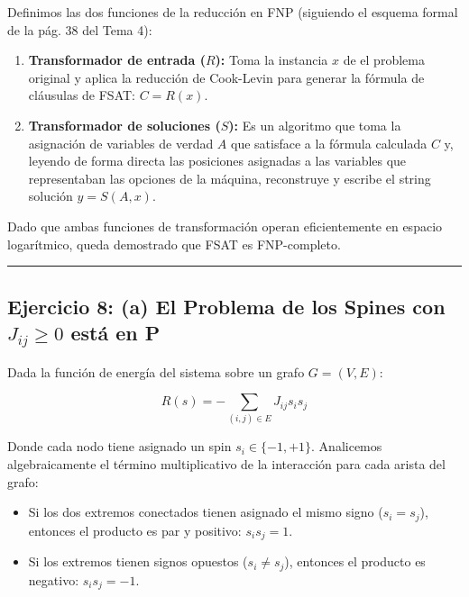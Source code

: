 \documentclass[12pt]{book} %
\providecommand{\tightlist}{%
  \setlength{\itemsep}{0pt}\setlength{\parskip}{0pt}}
\begin{document}
Definimos las dos funciones de la reducción en FNP (siguiendo el esquema
formal de la pág. 38 del Tema 4):

\begin{enumerate}
\def\labelenumi{\arabic{enumi}.}
\item
  \textbf{Transformador de entrada (\(R\)):} Toma la instancia \(x\) de
  el problema original y aplica la reducción de Cook-Levin para generar
  la fórmula de cláusulas de FSAT: \(C = R(x)\).
\item
  \textbf{Transformador de soluciones (\(S\)):} Es un algoritmo que toma
  la asignación de variables de verdad \(A\) que satisface a la fórmula
  calculada \(C\) y, leyendo de forma directa las posiciones asignadas a
  las variables que representaban las opciones de la máquina,
  reconstruye y escribe el string solución \(y = S(A, x)\).
\end{enumerate}

Dado que ambas funciones de transformación operan eficientemente en
espacio logarítmico, queda demostrado que FSAT es FNP-completo.

\begin{center}\rule{0.5\linewidth}{0.5pt}\end{center}

\hypertarget{ejercicio-8-a-el-problema-de-los-spines-con-j_ij-ge-0-estuxe1-en-p}{%
\subsection{\texorpdfstring{Ejercicio 8: (a) El Problema de los Spines
con \(J_{ij} \ge 0\) está en
P}{Ejercicio 8: (a) El Problema de los Spines con J\_\{ij\} \textbackslash ge 0 está en P}}\label{ejercicio-8-a-el-problema-de-los-spines-con-j_ij-ge-0-estuxe1-en-p}}

Dada la función de energía del sistema sobre un grafo \(G = (V, E)\):

\[R(s) = -\sum_{(i,j)\in E} J_{ij} s_i s_j\]

Donde cada nodo tiene asignado un spin \(s_i \in \{-1, +1\}\).
Analicemos algebraicamente el término multiplicativo de la interacción
para cada arista del grafo:

\begin{itemize}
\tightlist
\item
  Si los dos extremos conectados tienen asignado el mismo signo
  (\(s_i = s_j\)), entonces el producto es par y positivo:
  \(s_i s_j = 1\).
\item
  Si los extremos tienen signos opuestos (\(s_i \neq s_j\)), entonces el
  producto es negativo: \(s_i s_j = -1\).
\end{itemize}
\end{document}
